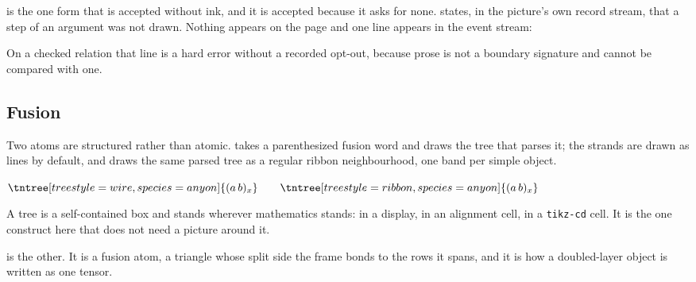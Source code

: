  is the one form that is accepted without ink, and it is
accepted because it asks for none.   states, in the
picture's own record stream, that a step of an argument was not drawn.
Nothing appears on the page and one line appears in the event stream:

\begin{center}
\end{center}

\noindent On a checked relation that line is a hard error without a
recorded opt-out, because prose is not a boundary signature and cannot be
compared with one.

\subsection{Fusion}

Two atoms are structured rather than atomic.   takes a
parenthesized fusion word and draws the tree that parses it; the strands
are drawn as lines by default, and 
draws the same parsed tree as a regular ribbon neighbourhood, one band per
simple object.

\begin{tnexample}[
  formula={m_{ab}^{x}\colon a\otimes b\to x},
  caption={one fusion tree in both strand styles},
  index={Both pictures are the same chosen fusion morphism.  The wire
    style meets three lines at one trivalent vertex; the ribbon style
    gives each simple object a band and joins them at a vertex patch.},
  signature={}]
$\tntree[tree style=wire, species=anyon]{(a\,b)_x}
 \qquad
 \tntree[tree style=ribbon, species=anyon]{(a\,b)_x}$
\end{tnexample}

A tree is a self-contained box and stands wherever mathematics stands: in
a display, in an alignment cell, in a \texttt{tikz-cd} cell.  It is the
one construct here that does not need a picture around it.

 is the other.  It is a fusion atom, a triangle whose split
side the frame bonds to the rows it spans, and it is how a doubled-layer
object is written as one tensor.

